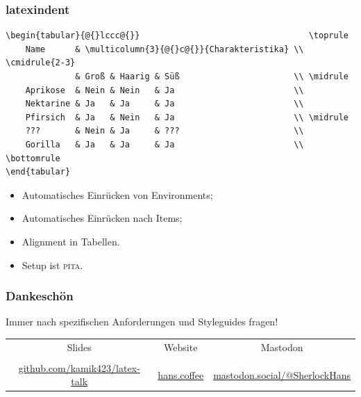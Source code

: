 \documentclass{beamer}
\makeatletter
\def\beamer@writeslidentry@miniframesoff{%
    \expandafter\beamer@ifempty\expandafter{\beamer@framestartpage}{}%
    {%
        \clearpage\beamer@notesactions%
    }
}
\newcommand*{\miniframesoff}{\let\beamer@writeslidentry=\beamer@writeslidentry@miniframesoff}
\makeatother
\begin{document}
\begin{frame}[fragile]
    \frametitle{latexindent}
    \begin{lstlisting}[basicstyle=\ttfamily\scriptsize]
\begin{tabular}{@{}lccc@{}}                                  \toprule
    Name      & \multicolumn{3}{@{}c@{}}{Charakteristika} \\ \cmidrule{2-3}
              & Groß & Haarig & Süß                       \\ \midrule
    Aprikose  & Nein & Nein   & Ja                        \\
    Nektarine & Ja   & Ja     & Ja                        \\
    Pfirsich  & Ja   & Nein   & Ja                        \\ \midrule
    ???       & Nein & Ja     & ???                       \\
    Gorilla   & Ja   & Ja     & Ja                        \\ \bottomrule
\end{tabular}
    \end{lstlisting}
    \begin{itemize}
        \item Automatisches Einrücken von Environments;
        \item Automatisches Einrücken nach Items;
        \item Alignment in Tabellen.
        \item Setup ist \textsc{pita}.
    \end{itemize}
\end{frame}

\appendix
\miniframesoff
\begin{frame}[fragile]
    \frametitle{Dankeschön}
    Immer nach spezifischen Anforderungen und Styleguides fragen!\\\vfill

    \pause

    \begin{tabularx}{\linewidth}{@{}CCC@{}}
        Slides                                                       & Website                                   & Mastodon                                                    \\
         &  &  \\
        \url{github.com/kamik423/latex-talk}                         & \url{hans.coffee}                         & \url{mastodon.social/@SherlockHans}                         \\
    \end{tabularx}

\end{frame}
\end{document}
